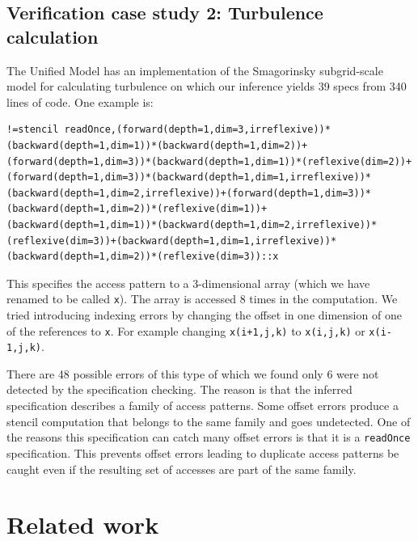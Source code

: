 \documentclass[9pt]{sigplanconf}
\theoremstyle{definition}
\begin{document}
\subsection{Verification case study 2: Turbulence calculation}

The Unified Model has an implementation of the Smagorinsky
subgrid-scale model for calculating turbulence on which our
inference yields 39 specs from 340 lines of code. One example is:

\begin{verbatim}
!=stencil readOnce,(forward(depth=1,dim=3,irreflexive))*(backward(depth=1,dim=1))*(backward(depth=1,dim=2))+(forward(depth=1,dim=3))*(backward(depth=1,dim=1))*(reflexive(dim=2))+(forward(depth=1,dim=3))*(backward(depth=1,dim=1,irreflexive))*(backward(depth=1,dim=2,irreflexive))+(forward(depth=1,dim=3))*(backward(depth=1,dim=2))*(reflexive(dim=1))+(backward(depth=1,dim=1))*(backward(depth=1,dim=2,irreflexive))*(reflexive(dim=3))+(backward(depth=1,dim=1,irreflexive))*(backward(depth=1,dim=2))*(reflexive(dim=3))::x
\end{verbatim}
%
This specifies the access pattern to a 3-dimensional array (which we have renamed to be called \texttt{x}). The array is accessed 8 times in the computation. We tried introducing indexing errors by changing the offset in one dimension of one of the references to \texttt{x}. For example changing \texttt{x(i+1,j,k)} to \texttt{x(i,j,k)} or \texttt{x(i-1,j,k)}.

There are 48 possible errors of this type of which we found only 6 were not 
detected by the specification checking. The reason is that the inferred
specification describes a family of access patterns. Some offset errors
produce a stencil computation that belongs to the same family and goes
undetected.
One of the reasons this specification can catch many offset errors is that it is
a \texttt{readOnce} specification. This prevents offset errors leading to
duplicate access patterns be caught even if the resulting set of accesses are
part of the same family.
\section{Related work}
\label{sec:discussion}
\end{document}
